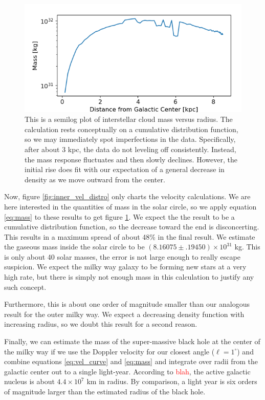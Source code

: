 \documentclass[12pt]{article}
\begin{document}
\begin{figure}
	\centering
	\includegraphics[width=.8\linewidth]{inner_mass_distro}
	\caption{This is a semilog plot of interstellar cloud mass versus radius. The calculation rests conceptually on a cumulative distribution function, so we may immediately spot imperfections in the data. Specifically, after about 3 kpc, the data do not leveling off consistently. Instead, the mass response fluctuates and then slowly declines. However, the initial rise does fit with our expectation of a general decrease in density as we move outward from the center.}
	\label{fig:inner_mass_distro}
\end{figure}

Now, figure \ref{fig:inner_vel_distro} only charts the velocity calculations. We are here interested in the quantities of mass in the solar circle, so we apply equation \ref{eq:mass} to these results to get figure \ref{fig:inner_mass_distro}. We expect the the result to be a cumulative distribution function, so the decrease toward the end is disconcerting. This results in a maximum spread of about 48\% in the final result. We estimate the gaseous mass inside the solar circle to be $(8.16075 \pm .19450) \times 10^{31}$ kg. This is only about 40 solar masses, the error is not large enough to really escape suspicion. We expect the milky way galaxy to be forming new stars at a very high rate, but there is simply not enough mass in this calculation to justify any such concept.

Furthermore, this is about one order of magnitude smaller than our analogous result for the outer milky way. We expect a decreasing density function with increasing radius, so we doubt this result for a second reason.

Finally, we can estimate the mass of the super-massive black hole at the center of the milky way if we use the Doppler velocity for our closest angle ($\ell = 1^\circ$) and combine equations \ref{eq:vel_curve} and \ref{eq:mass} and integrate over radii from the galactic center out to a single light-year. According to \textcolor{red}{blah}, the active galactic nucleus is about $4.4 \times 10^{7}$ km in radius. By comparison, a light year is six orders of magnitude larger than the estimated radius of the black hole.
\end{document}
